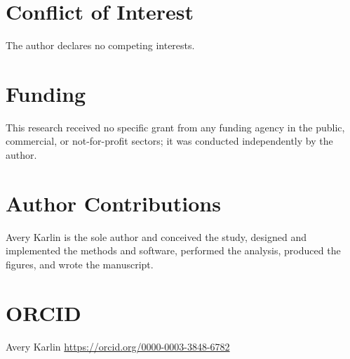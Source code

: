 \documentclass[11pt]{article}
\begin{document}
\section*{Conflict of Interest}
The author declares no competing interests.

\section*{Funding}
This research received no specific grant from any funding agency in the public,
commercial, or not-for-profit sectors; it was conducted independently by the
author.

\section*{Author Contributions}
Avery Karlin is the sole author and conceived the study, designed and implemented
the methods and software, performed the analysis, produced the figures, and wrote
the manuscript.

\section*{ORCID}
Avery Karlin \quad \href{https://orcid.org/0000-0003-3848-6782}{https://orcid.org/0000-0003-3848-6782}



\end{document}
